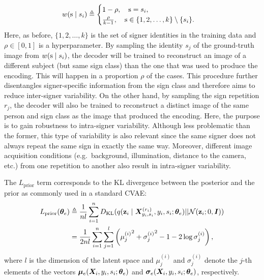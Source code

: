 \begin{equation}
    w({\textnormal{s}} \mid s_{i}) \triangleq
    \begin{cases}
        1-\rho, \quad {\textnormal{s}}=s_{i}, \\
        \frac{\rho}{k-1}, \quad {\textnormal{s}} \in \{1,2,\dots,k\} \setminus \lbrace s_{i} \rbrace.
    \end{cases}
\end{equation}
Here, as before, $\{1,2,\dots,k\}$ is the set of signer identities in the training data and $\rho \in [0, 1]$ is a hyperparameter. By sampling the identity $s_{j}$ of the ground-truth image from $w({\textnormal{s}} \mid s_{i})$, the decoder will be trained to reconstruct an image of a different subject (but same sign class) than the one that was used to produce the encoding. This will happen in a proportion $\rho$ of the cases. This procedure further disentangles signer-specific information from the sign class and therefore aims to reduce inter-signer variability. On the other hand, by sampling the sign repetition $r_{j}$, the decoder will also be trained to reconstruct a distinct image of the same person and sign class as the image that produced the encoding. Here, the purpose is to gain robustness to intra-signer variability. Although less problematic than the former, this type of variability is also relevant since the same signer does not always repeat the same sign in exactly the same way. Moreover, different image acquisition conditions (e.g.\ background, illumination, distance to the camera, etc.) from one repetition to another also result in intra-signer variability.

The $L_{\text{prior}}$ term corresponds to the KL divergence between the posterior and the prior as commonly used in a standard CVAE:
\begin{align}
    \label{eq:loss_prior}
    L_{\text{prior}}({\bm{\theta}}_{e}) &\triangleq \frac{1}{nl} \sum_{i=1}^n D_{\mathrm{KL}}(q({\mathbf{z}}_{i} \mid {\bm{X}}^{(r_{i})}_{y_{i},s_{i}}, y_{i}, s_{i}; {\bm{\theta}}_e) || {\mathcal{N}}({\mathbf{z}}_{i}; 0, {\bm{I}})) \nonumber\\
    &= \frac{1}{2nl} \sum_{i=1}^n \sum_{j=1}^l \left({\mu^{(i)}_j}^2 + {\sigma^{(i)}_j}^2 -1 - 2\log {\sigma^{(i)}_j}\right),
\end{align}
where $l$ is the dimension of the latent space and $\mu^{(i)}_j$ and $\sigma^{(i)}_j$ denote the $j$-th elements of the vectors ${\bm{\mu}}_{e}({\bm{X}}_i, y_i, s_i; {\bm{\theta}}_e)$ and ${\bm{\sigma}}_{e}({\bm{X}}_i, y_i, s_i; {\bm{\theta}}_e)$, respectively.

